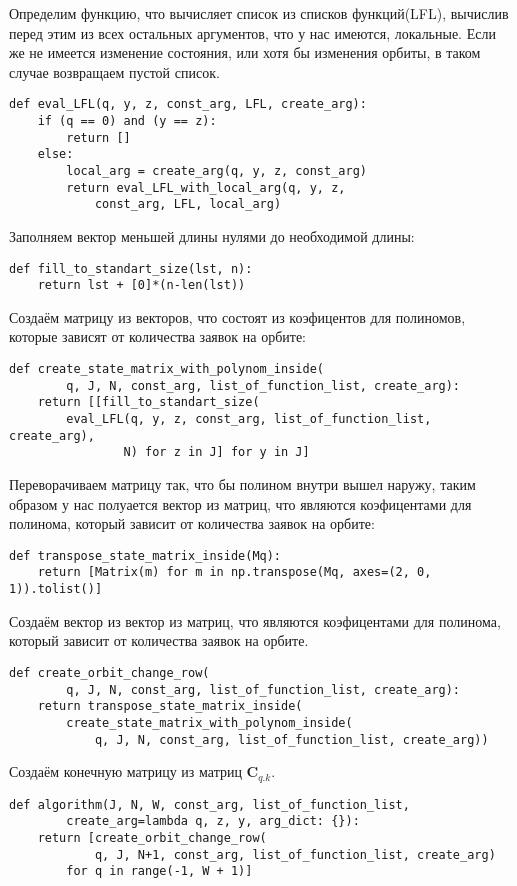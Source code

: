 Определим функцию, что вычисляет список из списков функций(LFL),
вычислив перед этим из всех остальных аргументов, что у нас имеются,
локальные. Если же не имеется изменение состояния, или хотя бы
изменения орбиты, в таком случае возвращаем пустой список.
\begin{verbatim}
def eval_LFL(q, y, z, const_arg, LFL, create_arg):
	if (q == 0) and (y == z):
		return []
	else:
		local_arg = create_arg(q, y, z, const_arg)
		return eval_LFL_with_local_arg(q, y, z,
			const_arg, LFL, local_arg)
\end{verbatim}

Заполняем вектор меньшей длины нулями
до необходимой длины:
\begin{verbatim}
def fill_to_standart_size(lst, n):
	return lst + [0]*(n-len(lst))
\end{verbatim}

Создаём матрицу из векторов, что состоят из коэфицентов для полиномов,
которые зависят от количества заявок на орбите:
\begin{verbatim}
def create_state_matrix_with_polynom_inside(
		q, J, N, const_arg, list_of_function_list, create_arg):
	return [[fill_to_standart_size(
		eval_LFL(q, y, z, const_arg, list_of_function_list, create_arg),
				N) for z in J] for y in J]
\end{verbatim}

Переворачиваем матрицу так, что бы полином внутри вышел наружу,
таким образом у нас полуается вектор из матриц, что являются
коэфицентами для полинома, который зависит от количества заявок на орбите:
\begin{verbatim}
def transpose_state_matrix_inside(Mq):
	return [Matrix(m) for m in np.transpose(Mq, axes=(2, 0, 1)).tolist()]
\end{verbatim}

Создаём вектор из вектор из матриц, что являются
коэфицентами для полинома, который зависит от количества заявок на орбите.
\begin{verbatim}
def create_orbit_change_row(
		q, J, N, const_arg, list_of_function_list, create_arg):
	return transpose_state_matrix_inside(
		create_state_matrix_with_polynom_inside(
			q, J, N, const_arg, list_of_function_list, create_arg))
\end{verbatim}

Создаём конечную матрицу из матриц \(\boldsymbol{C}_{q.k}\). 
\begin{verbatim}
def algorithm(J, N, W, const_arg, list_of_function_list,
		create_arg=lambda q, z, y, arg_dict: {}):
	return [create_orbit_change_row(
			q, J, N+1, const_arg, list_of_function_list, create_arg)
		for q in range(-1, W + 1)]
\end{verbatim}

